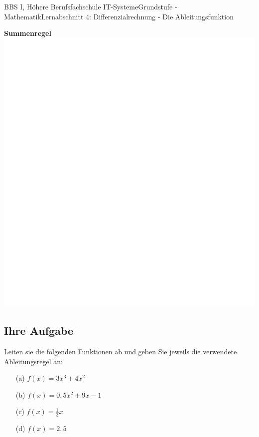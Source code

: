 \documentclass[11pt,twocolumn,oneside,openany,headings=optiontotoc,11pt,numbers=noenddot]{article}
\begin{document}
\begin{worksheet}{BBS I, Höhere Berufsfachschule IT-Systeme}{Grundstufe - Mathematik}{Lernabschnitt 4: Differenzialrechnung - Die Ableitungsfunktion}
		\par
		\textbf{Summenregel}\\
		\includegraphics[scale=0.1]{../../empty.jpg}\\
		\subsection*{Ihre Aufgabe}
		Leiten sie die folgenden Funktionen ab und geben Sie jeweils die verwendete Ableitungsregel an:
		\begin{itemize}
			\item[(a)] \(f(x) = 3x^3 + 4x^2\)
			\item[(b)] \(f(x) = 0,5x^2 + 9x - 1\)
			\item[(c)] \(f(x) = \frac{1}{3}x\)
			\item[(d)] \(f(x) = 2,5\)
		\end{itemize}		
	\end{worksheet}
\end{document}
